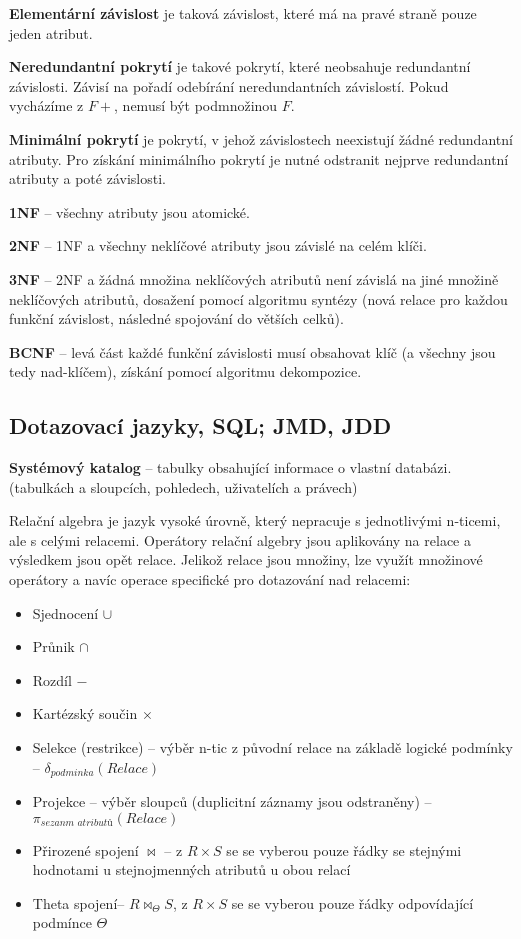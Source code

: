 \textbf{Elementární závislost} je taková závislost, které má na pravé straně pouze jeden atribut.

\textbf{Neredundantní pokrytí} je takové pokrytí, které neobsahuje redundantní závislosti. Závisí na pořadí odebírání neredundantních závislostí. Pokud vycházíme z $F+$, nemusí být podmnožinou $F$.

\textbf{Minimální pokrytí} je pokrytí, v jehož závislostech neexistují žádné redundantní atributy. Pro získání minimálního pokrytí je nutné odstranit nejprve redundantní atributy a poté závislosti.

\textbf{1NF} -- všechny atributy jsou atomické.

\textbf{2NF} -- 1NF a všechny neklíčové atributy jsou závislé na celém klíči.

\textbf{3NF} -- 2NF a žádná množina neklíčových atributů není závislá na jiné množině neklíčových atributů, dosažení pomocí algoritmu syntézy (nová relace pro každou funkční závislost, následné spojování do větších celků).

\textbf{BCNF} – levá část každé funkční závislosti musí obsahovat klíč (a všechny jsou tedy nad-klíčem), získání pomocí algoritmu dekompozice.
\subsection{Dotazovací jazyky, SQL; JMD, JDD}
\textbf{Systémový katalog} – tabulky obsahující informace o vlastní databázi. (tabulkách a sloupcích, pohledech, uživatelích a právech)

Relační algebra je jazyk vysoké úrovně, který nepracuje s jednotlivými n-ticemi, ale s celými relacemi. Operátory relační algebry jsou aplikovány na relace a výsledkem jsou opět relace. Jelikož relace jsou množiny, lze využít množinové operátory a navíc operace specifické pro dotazování nad relacemi:
\begin{itemize}
\item Sjednocení $\cup$
\item Průnik $\cap$
\item Rozdíl $-$
\item Kartézský součin $\times$
\item Selekce (restrikce) – výběr n-tic z původní relace na základě logické podmínky -- $\delta_\textit{podminka} (\textit{Relace})$
\item Projekce – výběr sloupců (duplicitní záznamy jsou odstraněny) -- $\pi_\textit{sezanm atributů} (\textit{Relace})$
\item Přirozené spojení $\bowtie$ -- z $R\times S$ se se vyberou pouze řádky se stejnými hodnotami u stejnojmenných atributů u obou relací
\item Theta spojení-- $R \bowtie_\Theta S$, z $R\times S$ se se vyberou pouze řádky odpovídající podmínce $\Theta$
\end{itemize}

